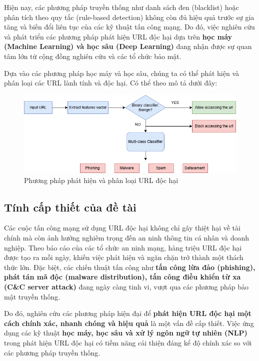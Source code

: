 \documentclass[13pt]{article}
\begin{document}
    Hiện nay, các phương pháp truyền thống như danh sách đen (blacklist) hoặc phân tích theo quy tắc (rule-based detection) không còn đủ hiệu quả trước sự gia tăng và biến đổi liên tục của các kỹ thuật tấn công mạng. Do đó, việc nghiên cứu và phát triển các phương pháp phát hiện URL độc hại dựa trên \textbf{học máy (Machine Learning) và học sâu (Deep Learning)} đang nhận được sự quan tâm lớn từ cộng đồng nghiên cứu và các tổ chức bảo mật.
    
    Dựa vào các phương pháp học máy và học sâu, chúng ta có thể phát hiện và phân loại các URL lành tính và độc hại. Có thể theo mô tả dưới đây:

    \begin{figure}[h!]
        \centering
        \includegraphics[width=0.7\linewidth]{image/h1.png}
            \caption{Phương pháp phát hiện và phân loại URL độc hại}
            \label{fig:label1}
    \end{figure}
    
    \subsection{Tính cấp thiết của đề tài}
    Các cuộc tấn công mạng sử dụng URL độc hại không chỉ gây thiệt hại về tài chính mà còn ảnh hưởng nghiêm trọng đến an ninh thông tin cá nhân và doanh nghiệp. Theo báo cáo của các tổ chức an ninh mạng, hàng triệu URL độc hại được tạo ra mỗi ngày, khiến việc phát hiện và ngăn chặn trở thành một thách thức lớn. Đặc biệt, các chiến thuật tấn công như \textbf{tấn công lừa đảo (phishing), phát tán mã độc (malware distribution), tấn công điều khiển từ xa (C&C server attack)} đang ngày càng tinh vi, vượt qua các phương pháp bảo mật truyền thống.
    
    Do đó, nghiên cứu các phương pháp hiện đại để \textbf{phát hiện URL độc hại một cách chính xác, nhanh chóng và hiệu quả} là một vấn đề cấp thiết. Việc ứng dụng các kỹ thuật \textbf{học máy, học sâu và xử lý ngôn ngữ tự nhiên (NLP)} trong phát hiện URL độc hại có tiềm năng cải thiện đáng kể độ chính xác so với các phương pháp truyền thống.
\end{document}
